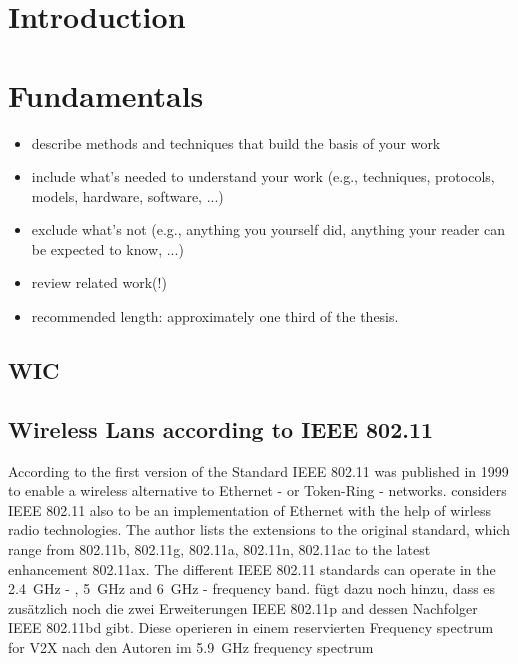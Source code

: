 \documentclass[]{nsm-thesis}
\begin{document}
\cleardoublepage
{}


\chapter{Introduction}
\label{sec:introduction}


\chapter{Fundamentals}
\label{sec:fundamentals}



\begin{itemize}
\item describe methods and techniques that build the basis of your work
\item include what's needed to understand your work (e.g., techniques, protocols, models, hardware, software, ...)
\item exclude what's not (e.g., anything you yourself did, anything your reader can be expected to know, ...)
\item review related work(!)
\item recommended length: approximately one third of the thesis.
\end{itemize}

\section{\acl{WIC}}





\section{Wireless Lans according to IEEE 802.11}
According to \textcite{kauffels_wireless_2002} the first version of the Standard IEEE 802.11 was published in 1999 to enable a wireless alternative to Ethernet - or Token-Ring - networks.
\textcite{sauter_wireless_2022} considers IEEE 802.11 also to be an implementation of Ethernet with the help of wirless radio technologies. The author lists the extensions to the original standard, which range from 802.11b, 802.11g, 802.11a, 802.11n, 802.11ac to the latest enhancement 802.11ax. The different IEEE 802.11 standards can operate in the  \SI{2.4}{\giga\hertz} - , \SI{5}{\giga\hertz} and \SI{6}{\giga\hertz} - frequency band. 
\textcite{jacob_system-level_2020} fügt dazu noch hinzu, dass es zusätzlich noch die zwei Erweiterungen IEEE 802.11p and dessen Nachfolger IEEE 802.11bd gibt. Diese operieren in einem reservierten Frequency spectrum for \ac{V2X} nach den Autoren im  \SI{5.9}{\giga\hertz} frequency spectrum
\end{document}
